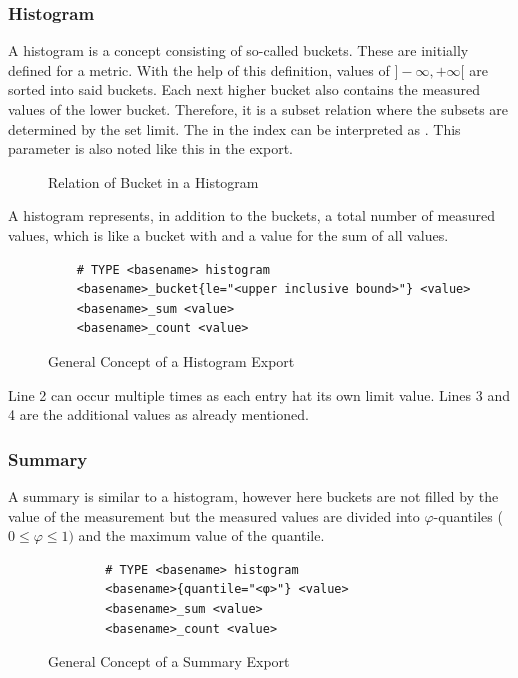 \subsubsection{Histogram}
A histogram is a concept consisting of so-called buckets. These are initially defined for a metric. With the help of this definition, values of $]-\infty,+\infty[$ are sorted into said buckets. Each next higher bucket also contains the measured values of the lower bucket. Therefore, it is a subset relation where the subsets are determined by the set limit. The  in the index can be interpreted as . This parameter is also noted like this in the export.
\begin{figure}[H]
	\caption{Relation of Bucket in a Histogram}
\end{figure}
A histogram represents, in addition to the buckets, a total number of measured values, which is like a bucket with  and a value for the sum of all values.
\begin{figure}[H]
	\begin{verbatim}
	# TYPE <basename> histogram
	<basename>_bucket{le="<upper inclusive bound>"} <value>
	<basename>_sum <value>
	<basename>_count <value>
	\end{verbatim}
	\caption{General Concept of a Histogram Export}
\end{figure}
Line 2 can occur multiple times as each entry hat its own limit value. Lines 3 and 4 are the additional values as already mentioned.
\subsubsection{Summary}
A summary is similar to a histogram, however here buckets are not filled by the value of the measurement but the measured values are divided into $\varphi$-quantiles ($0 \le \varphi \le 1)$ and the maximum value of the quantile.
\begin{figure}[H]
	\begin{verbatim}
		# TYPE <basename> histogram
		<basename>{quantile="<φ>"} <value>
		<basename>_sum <value>
		<basename>_count <value>
	\end{verbatim}
	\caption{General Concept of a Summary Export}
\end{figure}
